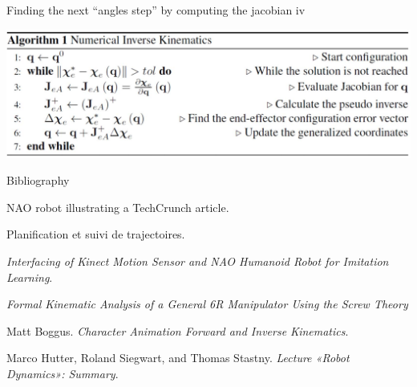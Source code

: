 \documentclass{beamer}
\begin{document}
\begin{frame}{Finding the next ``angles step'' by computing the jacobian iv}

\includegraphics[scale = 0.3]{eth3.PNG}\cite{6}
\end{frame}






\begin{frame}[allowframebreaks]{Bibliography}
\begin{thebibliography}{9}

NAO robot illustrating a TechCrunch article.

Planification et suivi de trajectoires. 
 
\textit{Interfacing of Kinect Motion Sensor and NAO Humanoid Robot for Imitation Learning}. 

\textit{Formal Kinematic Analysis of a General 6R Manipulator Using the Screw Theory}

Matt Boggus.
\textit{Character Animation Forward and Inverse Kinematics}.

Marco Hutter, Roland Siegwart, and Thomas Stastny.
\textit{Lecture «Robot Dynamics»: Summary}.
% 
\end{thebibliography}
\end{frame}
\end{document}
